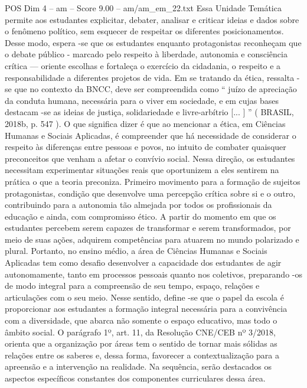 \begin{textsample}{POS Dim 4 – am – Score 9.00 – am/am\_em\_22.txt}
Essa Unidade Temática permite aos estudantes explicitar, debater, analisar e criticar ideias e dados sobre o fenômeno político, sem esquecer de respeitar os diferentes posicionamentos.
Desse modo, espera -se que os estudantes enquanto protagonistas reconheçam que o debate público - marcado pelo respeito à liberdade, autonomia e consciência crítica — oriente escolhas e fortaleça o exercício da cidadania, o respeito e a responsabilidade a diferentes projetos de vida.
Em se tratando da ética, ressalta -se que no contexto da BNCC, deve ser compreendida como “ juízo de apreciação da conduta humana, necessária para o viver em sociedade, e em cujas bases destacam -se as ideias de justiça, solidariedade e livre-arbítrio [... ] ” ( BRASIL, 2018b, p. 547 ).
O que significa dizer é que ao mencionar a ética, em Ciências Humanas e Sociais Aplicadas, é compreender que há necessidade de considerar o respeito às diferenças entre pessoas e povos, no intuito de combater quaisquer preconceitos que venham a afetar o convívio social.
Nessa direção, os estudantes necessitam experimentar situações reais que oportunizem a eles sentirem na prática o que a teoria preconiza.
Primeiro movimento para a formação de sujeitos protagonistas, condição que desenvolve uma percepção crítica sobre si e o outro, contribuindo para a autonomia tão almejada por todos os profissionais da educação e ainda, com compromisso ético.
A partir do momento em que os estudantes percebem serem capazes de transformar e serem transformados, por meio de suas ações, adquirem competências para atuarem no mundo polarizado e plural.
Portanto, no ensino médio, a área de Ciências Humanas e Sociais Aplicadas tem como desafio desenvolver a capacidade dos estudantes de agir autonomamente, tanto em processos pessoais quanto nos coletivos, preparando -os de modo integral para a compreensão de seu tempo, espaço, relações e articulações com o seu meio.
Nesse sentido, define -se que o papel da escola é proporcionar aos estudantes a formação integral necessária para a convivência com a diversidade, que abarca não somente o espaço educativo, mas todo o âmbito social.
O parágrafo 1º, art. 11, da Resolução CNE/CEB nº 3/2018, orienta que a organização por áreas tem o sentido de tornar mais sólidas as relações entre os saberes e, dessa forma, favorecer a contextualização para a apreensão e a intervenção na realidade.
Na sequência, serão destacados os aspectos específicos constantes dos componentes curriculares dessa área.

\end{textsample}
